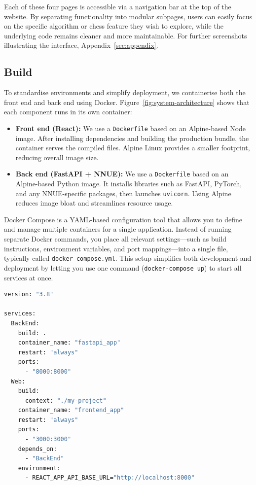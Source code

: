 \documentclass[12pt,a4paper]{article}
\begin{document}
    \noindent
    Each of these four pages is accessible via a navigation bar at the top of the website. By separating
    functionality into modular subpages, users can easily focus on the specific algorithm or chess
    feature they wish to explore, while the underlying code remains cleaner and more maintainable.
    For further screenshots illustrating the interface, Appendix~\ref{sec:appendix}.
    
\subsection{Build}

To standardise environments and simplify deployment, we containerise both the front end and back end using Docker. 
Figure~\ref{fig:system-architecture} shows that each component runs in its own container:

\begin{itemize}
  \item \textbf{Front end (React):} We use a \texttt{Dockerfile} based on an Alpine-based Node image. After installing dependencies and building the production bundle, the container serves the compiled files. Alpine Linux provides a smaller footprint, reducing overall image size.

  \item \textbf{Back end (FastAPI + NNUE):} We use a \texttt{Dockerfile} based on an Alpine-based Python image. It installs libraries such as FastAPI, PyTorch, and any NNUE-specific packages, then launches \texttt{uvicorn}. Using Alpine reduces image bloat and streamlines resource usage.
\end{itemize}

Docker Compose is a YAML-based configuration tool that allows you to define and manage multiple containers for a single application. Instead of running separate Docker commands, you place all relevant settings—such as build instructions, environment variables, and port mappings—into a single file, typically called \texttt{docker-compose.yml}. This setup simplifies both development and deployment by letting you use one command (\texttt{docker-compose up}) to start all services at once.

\begin{lstlisting}[language=bash,caption={docker-compose.yml},label={lst:docker-compose at project root}]
version: "3.8"

services:
  BackEnd:
    build: .
    container_name: "fastapi_app"
    restart: "always"
    ports:
      - "8000:8000"
  Web:
    build:
      context: "./my-project"
    container_name: "frontend_app"
    restart: "always"
    ports:
      - "3000:3000"
    depends_on:
      - "BackEnd"
    environment:
      - REACT_APP_API_BASE_URL="http://localhost:8000"
\end{lstlisting}
\end{document}
